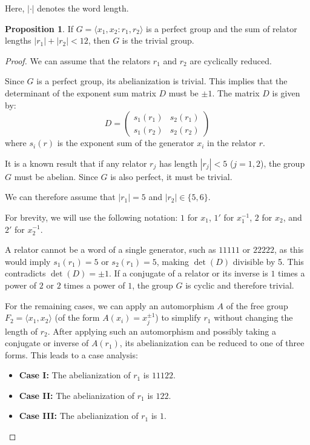 \documentclass[pdflatex,sn-mathphys-num]{sn-jnl}%
\theoremstyle{plain}
\theoremstyle{definition}
\newtheorem{proposition}[theorem]{Proposition}
\theoremstyle{remark}
\begin{document}
Here, $|\cdot|$ denotes the word length.

\begin{proposition}\label{prop:Fico1}
If $G=\langle x_1, x_2 : r_1, r_2 \rangle$ is a perfect group and the sum of relator lengths $|r_1|+|r_2|<12$, then $G$ is the trivial group. 


\begin{proof}
We can assume that the relators $r_1$ and $r_2$ are cyclically reduced.

Since $G$ is a perfect group, its abelianization is trivial. This implies that the determinant of the exponent sum matrix $D$ must be $\pm 1$. The matrix $D$ is given by:
\[
D = \begin{pmatrix}
    s_1(r_1) & s_2(r_1) \\
    s_1(r_2) & s_2(r_2)
\end{pmatrix}
\]
where $s_i(r)$ is the exponent sum of the generator $x_i$ in the relator $r$.

It is a known result that if any relator $r_j$ has length $|r_j| < 5$ ($j=1,2$), the group $G$ must be abelian. Since $G$ is also perfect, it must be trivial.

We can therefore assume that $|r_1|=5$ and $|r_2| \in \{5, 6\}$.

For brevity, we will use the following notation: $1$ for $x_1$, $1'$ for $x_1^{-1}$, $2$ for $x_2$, and $2'$ for $x_2^{-1}$.

A relator cannot be a word of a single generator, such as $11111$ or $22222$, as this would imply $s_1(r_1)=5$ or $s_2(r_1)=5$, making $\det(D)$ divisible by 5. This contradicts $\det(D) = \pm 1$. If a conjugate of a relator or its inverse is $1$ times a power of $2$ or $2$ times a power of $1$, the group $G$ is cyclic and therefore trivial.

For the remaining cases, we can apply an automorphism $A$ of the free group $F_2 = \langle x_1, x_2 \rangle$ (of the form $A(x_i) = x_j^{\pm 1}$) to simplify $r_1$ without changing the length of $r_2$. After applying such an automorphism and possibly taking a conjugate or inverse of $A(r_1)$, its abelianization can be reduced to one of three forms. This leads to a case analysis:

\begin{itemize}
    \item[] \textbf{Case I:} The abelianization of $r_1$ is $11122$.
    \item[] \textbf{Case II:} The abelianization of $r_1$ is $122$.
    \item[] \textbf{Case III:} The abelianization of $r_1$ is $1$.
\end{itemize}


\end{proof}
\end{proposition}
\end{document}
